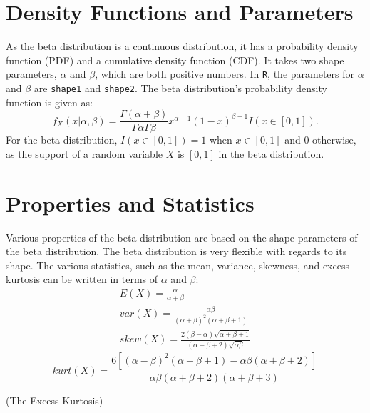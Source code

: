 \documentclass{article}\usepackage[]{graphicx}\usepackage[]{xcolor}
\begin{document}
\begin{multicols}{2}
\section{Density Functions and Parameters}
As the beta distribution is a continuous distribution, it has a probability density function (PDF) and a cumulative density function (CDF). It takes two shape parameters, $\alpha$ and $\beta$, which are both positive numbers. In \texttt{R}, the parameters for $\alpha$ and $\beta$ are \texttt{shape1} and \texttt{shape2}. The beta distribution's probability density function is given as:
 \[f_X(x|\alpha, \beta) = \frac{\Gamma(\alpha + \beta)}{\Gamma\alpha\Gamma\beta} x^{\alpha-1}(1-x)^{\beta-1}I(x \in [0,1]).\]
\indent For the beta distribution, $I(x \in [0,1]) = 1$ when $x \in [0,1]$ and $0$ otherwise, as the support of a random variable $X$ is $[0,1]$ in the beta distribution. 

\section{Properties and Statistics}
Various properties of the beta distribution are based on the shape parameters of the beta distribution. The beta distribution is very flexible with regards to its shape. The various statistics, such as the mean, variance, skewness, and excess kurtosis can be written in terms of $\alpha$ and $\beta$: 
 \begin{align*}
 E(X) = \frac{\alpha}{\alpha + \beta} \tag{The Mean}\\
var(X) = \frac{\alpha\beta}{(\alpha + \beta)^2(\alpha + \beta + 1)} \tag{The Variance} \\
skew(X) = \frac{2(\beta - \alpha)\sqrt{\alpha + \beta + 1}}{(\alpha + \beta + 2)\sqrt{\alpha\beta}} \tag{The Skewness}
 \end{align*}
 \[kurt(X) = \frac{6[(\alpha - \beta)^2(\alpha + \beta + 1) - \alpha\beta(\alpha + \beta + 2)]}{\alpha\beta(\alpha + \beta + 2)(\alpha + \beta + 3)}\]
\begin{flushright}
(The Excess Kurtosis)
\end{flushright}


\end{multicols}
\end{document}

